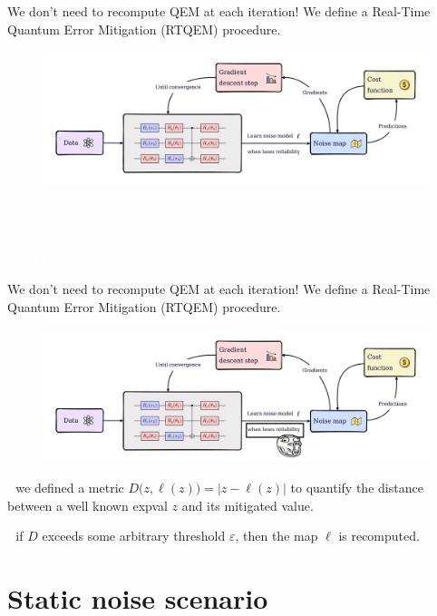 \documentclass[8pt, xcolor={svgnames}, hyperref={linkcolor=black}]{beamer}
\begin{document}
\begin{frame}{We don't need to recompute QEM at each iteration!}
We define a Real-Time Quantum Error Mitigation (RTQEM) procedure.
\pause
\begin{figure}
    \includegraphics[width=1\textwidth]{figures/rtqem.pdf}
\end{figure}
\textcolor{white}{\faEdit\,\, we defined a metric $ D\bigl(z, \ell(z)\bigr) = |z - \ell(z)|$
to quantify the distance between a well known expval $z$ and its mitigated value.}

\textcolor{white}{\faAmbulance\,\, if $D$ exceeds some arbitrary threshold $\varepsilon$, then the
map $\ell$ is recomputed.}
\end{frame}

\begin{frame}{We don't need to recompute QEM at each iteration!}
We define a Real-Time Quantum Error Mitigation (RTQEM) procedure.
\begin{figure}
    \includegraphics[width=1\textwidth]{figures/lol.png}
\end{figure}
\pause
\faEdit\,\, we defined a metric $ D\bigl(z, \ell(z)\bigr) = |z - \ell(z)|$
to quantify the distance between a well known expval $z$ and its mitigated value.
\pause

\faAmbulance\,\, if $D$ exceeds some arbitrary threshold $\varepsilon$, then the
map $\ell$ is recomputed.
\end{frame}

\section{Static noise scenario}
\end{document}
